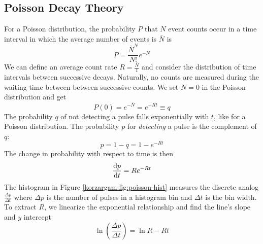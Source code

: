 \documentclass[11pt, a4paper]{article}
\begin{document}
\subsection{Poisson Decay Theory}
For a Poisson distribution, the probability $ P $ that $ N $ event counts occur in a time interval in which the average number of events is $ \bar{N} $ is
\begin{equation*}
	P = \frac{\bar{N}^{N}}{N!}e^{-\bar{N}}
\end{equation*}
We can define an average count rate $ R = \frac{\bar{N}}{t} $ and consider the distribution of time intervals between successive decays. Naturally, no counts are measured during the waiting time between between successive counts. We set $ N = 0$ in the Poisson distribution and get
\begin{equation*}
	P(0) = e^{-\bar{N}} = e^{-Rt} \equiv q
\end{equation*}
The probability $ q $ of not detecting a pulse falls exponentially with $ t $, like for a Poisson distribution. The probability $ p $ for \textit{detecting} a pulse is the complement of $ q $:
\begin{equation*}
	p = 1-q = 1 - e^{-Rt}
\end{equation*}
The change in probability with respect to time is then
\begin{equation*}
	\dv{p}{t} = Re^{-Rt}
\end{equation*}
The histogram in Figure \ref{korzargam:fig:poisson-hist} measures the discrete analog $ \frac{\Delta p}{\Delta t} $ where $ \Delta p $ is the number of pulses in a histogram bin and $ \Delta t $ is the bin width. To extract $ R $, we linearize the exponential relationship and find the line's slope and $ y $ intercept
\begin{equation*}
	\ln(\frac{\Delta p}{\Delta t}) = \ln R - Rt
\end{equation*}
\end{document}
